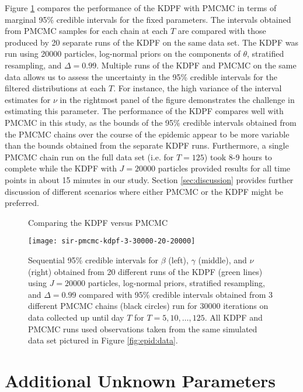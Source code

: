 Figure \ref{fig:epid:pmcmc} compares the performance of the KDPF with PMCMC in terms of marginal 95\% credible intervals for the fixed parameters. The intervals obtained from PMCMC samples for each chain at each $T$ are compared with those produced by 20 separate runs of the KDPF on the same data set. The KDPF was run using 20000 particles, log-normal priors on the components of $\theta$, stratified resampling, and $\Delta = 0.99$. Multiple runs of the KDPF and PMCMC on the same data allows us to assess the uncertainty in the 95\% credible intervals for the filtered distributions at each $T$. For instance, the high variance of the interval estimates for $\nu$ in the rightmost panel of the figure demonstrates the challenge in estimating this parameter. The performance of the KDPF compares well with PMCMC in this study, as the bounds of the 95\% credible intervals obtained from the PMCMC chains over the course of the epidemic appear to be more variable than the bounds obtained from the separate KDPF runs. Furthermore, a single PMCMC chain run on the full data set (i.e. for $T = 125$) took 8-9 hours to complete while the KDPF with $J = 20000$ particles provided results for all time points in about 15 minutes in our study. Section \ref{sec:discussion} provides further discussion of different scenarios where either PMCMC or the KDPF might be preferred.

\begin{figure}
\ssp
\centering
\caption{Comparing the KDPF versus PMCMC} \label{fig:epid:pmcmc}
\texttt{[image: sir-pmcmc-kdpf-3-30000-20-20000]}
\caption*{Sequential 95\% credible intervals for $\beta$ (left), $\gamma$ (middle), and $\nu$ (right) obtained from 20 different runs of the KDPF (green lines) using $J = 20000$ particles, log-normal priors, stratified resampling, and $\Delta = 0.99$ compared with 95\% credible intervals obtained from 3 different PMCMC chains (black circles) run for 30000 iterations on data collected up until day $T$ for $T = 5,10,\ldots,125$. All KDPF and PMCMC runs used observations taken from the same simulated data set pictured in Figure \ref{fig:epid:data}.}
\end{figure}

\section{Additional Unknown Parameters} \label{sec:epid:extend}

